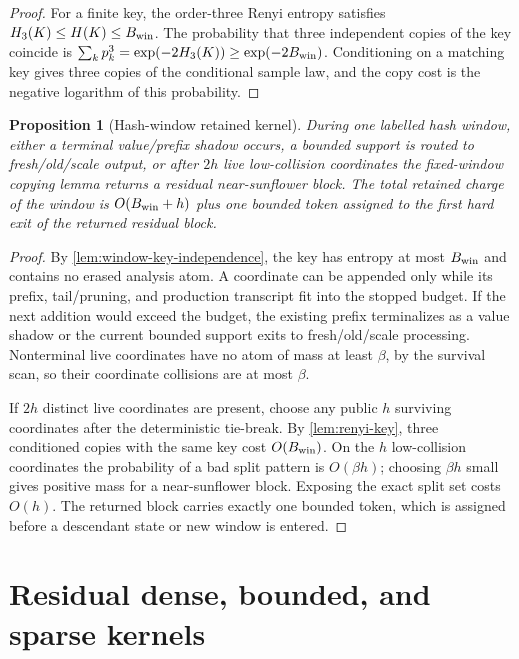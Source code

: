 \documentclass[11pt]{article}
\newcommand{\Cref}[1]{\ref{#1}}
\newtheorem{proposition}[theorem]{Proposition}
\theoremstyle{remark}
\begin{document}
\begin{proof}
For a finite key, the order-three Renyi entropy satisfies $H_3(K)\le H(K)\le B_{\rm win}$.  The probability that three independent copies of the key coincide is $\sum_k p_k^3=\exp(-2H_3(K))\ge \exp(-2B_{\rm win})$.  Conditioning on a matching key gives three copies of the conditional sample law, and the copy cost is the negative logarithm of this probability.
\end{proof}

\begin{proposition}[Hash-window retained kernel]\label{prop:appendix-hash-kernel}
During one labelled hash window, either a terminal value/prefix shadow occurs, a bounded support is routed to fresh/old/scale output, or after $2h$ live low-collision coordinates the fixed-window copying lemma returns a residual near-sunflower block.  The total retained charge of the window is $O(B_{\rm win}+h)$ plus one bounded token assigned to the first hard exit of the returned residual block.
\end{proposition}

\begin{proof}
By \Cref{lem:window-key-independence}, the key has entropy at most $B_{\rm win}$ and contains no erased analysis atom.  A coordinate can be appended only while its prefix, tail/pruning, and production transcript fit into the stopped budget.  If the next addition would exceed the budget, the existing prefix terminalizes as a value shadow or the current bounded support exits to fresh/old/scale processing.  Nonterminal live coordinates have no atom of mass at least $\beta$, by the survival scan, so their coordinate collisions are at most $\beta$.

If $2h$ distinct live coordinates are present, choose any public $h$ surviving coordinates after the deterministic tie-break.  By \Cref{lem:renyi-key}, three conditioned copies with the same key cost $O(B_{\rm win})$.  On the $h$ low-collision coordinates the probability of a bad split pattern is $O(\beta h)$; choosing $\beta h$ small gives positive mass for a near-sunflower block.  Exposing the exact split set costs $O(h)$.  The returned block carries exactly one bounded token, which is assigned before a descendant state or new window is entered.
\end{proof}

\section{Residual dense, bounded, and sparse kernels}\label{app:residual}
\end{document}
